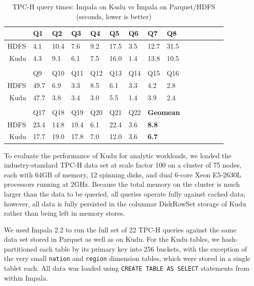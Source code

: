 \documentclass[twocolumn,9pt]{article}
\begin{document}
\begin{table}
  \begin{tabular}{rllllllllllllll}
& Q1 & Q2 & Q3 & Q4 & Q5 & Q6 & Q7 & Q8\\\hline
HDFS & 4.1 & 10.4 & 7.6 & 9.2 & 17.5 & 3.5 & 12.7 & 31.5\\
Kudu & 4.3 & 9.1 & 6.1 & 7.5 & 16.0 & 1.4 & 13.8 & 10.5 \\\\

& Q9 & Q10 & Q11 & Q12 & Q13 & Q14 & Q15 & Q16\\\hline
HDFS & 49.7 & 6.9 & 3.3 & 8.5 & 6.1 & 3.3 & 4.2 & 2.8\\
Kudu & 47.7 & 3.8 & 3.4 & 3.0 & 5.5 & 1.4 & 3.9 & 2.4\\\\

& Q17 & Q18 & Q19 & Q20 & Q21 & Q22 & \multicolumn{3}{l}{\bf Geomean}\\\hline
HDFS & 23.4 & 14.8 & 19.4 & 6.1 & 22.4 & 3.6 & \multicolumn{3}{l}{\bf 8.8} \\
Kudu & 17.7 & 19.0 & 17.8 & 7.0 & 12.0 & 3.6 & \multicolumn{3}{l}{\bf 6.7}
  \end{tabular}
  \caption{TPC-H query times: Impala on Kudu vs Impala on Parquet/HDFS (seconds, lower is better)}
  \label{fig:parquet_vs_kudu}
\end{table}

To evaluate the performance of Kudu for analytic workloads, we loaded the industry-standard TPC-H
data set at scale factor 100 on a cluster of 75 nodes, each with 64GB of memory, 12 spinning
disks, and dual 6-core Xeon E5-2630L processors running at 2GHz. Because the total memory on the
cluster is much larger than the data to be queried, all queries operate fully against cached
data; however, all data is fully persisted in the columnar DiskRowSet storage of Kudu rather than being
left in memory stores.

We used Impala 2.2 to run the full set of 22 TPC-H queries against the same data set stored in Parquet
as well as on Kudu. For the Kudu tables, we hash-partitioned each table by its primary key into
256 buckets, with the exception of the very small {\tt nation} and {\tt region} dimension tables,
which were stored in a single tablet each. All data was loaded using {\tt CREATE
TABLE AS SELECT} statements from within Impala.
\end{document}
